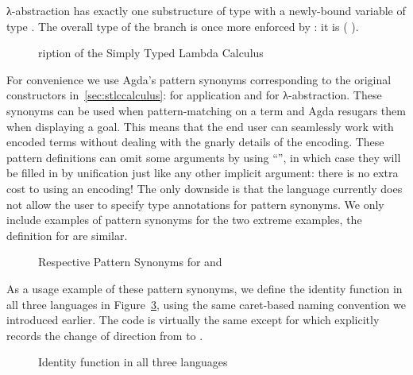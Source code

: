 λ-abstraction has exactly one substructure of type  with a newly-bound
variable of type . The overall type of the branch is once more enforced
by : it is (  ).

\begin{figure}[h]
\caption{ription of the Simply Typed Lambda Calculus\label{fig:descstlc}\label{fig:descBidiSTLC}}
\end{figure}

For convenience we use Agda's pattern synonyms corresponding to the
original constructors in~\cref{sec:stlccalculus}:
 for application and  for λ-abstraction. These
synonyms can be used when pattern-matching on a term and Agda resugars
them when displaying a goal. This means that the end user can
seamlessly work with encoded terms without dealing with the gnarly
details of the encoding.  These pattern definitions can omit some
arguments by using ``\AS{\_}'', in which case they will be filled in
by unification just like any other implicit argument: there is no
extra cost to using an encoding!  The only downside is that the
language currently does not allow the user to specify type annotations
for pattern synonyms. We only include examples of pattern synonyms
for the two extreme examples, the definition for  are similar.

\begin{figure}[h]
  \caption{Respective Pattern Synonyms for  and %
    \label{fig:patsLC}}
\end{figure}

As a usage example of these pattern synonyms, we define the identity
function in all three languages in Figure~\ref{fig:identity}, using the
same caret-based naming convention we introduced earlier. The code
is virtually the same except for  which explicitly records
the change of direction from  to .

\begin{figure}[h]
\begin{minipage}{0.25\textwidth}
\end{minipage}\hfill
\begin{minipage}{0.35\textwidth}
\end{minipage}\hfill
\begin{minipage}{0.30\textwidth}
\end{minipage}
\caption{Identity function in all three languages}\label{fig:identity}
\end{figure}

